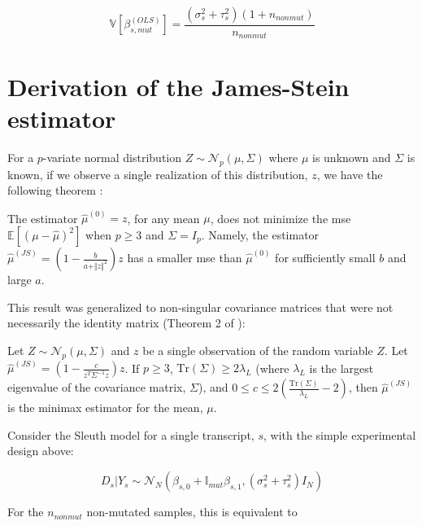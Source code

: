 \begin{equation}
  \mathbb{V} \left[\beta_{s, mut}^{(OLS)} \right] = \frac{(\sigma_s^2 + \tau_s^2)(1 + n_{nonmut})}{n_{nonmut}}
\end{equation}

\section{Derivation of the James-Stein estimator}
\label{sec:JS_derivation}

For a $p$-variate normal distribution $Z \sim \mathcal{N}_p(\mu, \Sigma)$ where $\mu$ is unknown and $\Sigma$ is known, if we observe a single realization of this distribution, $z$, we have the following theorem \cite{steinInadmissibilityUsualEstimator1956}:

\begin{theorem}
  The estimator $\hat{\mu}^{(0)} = z$, for any mean $\mu$, does not minimize the \gls{mse} $\mathbb{E} \left[ (\mu - \hat{\mu})^2 \right]$ when $p \ge 3$ and $\Sigma = I_p$. Namely, the estimator $\hat{\mu}^{(JS)} = \left( 1 - \frac{b}{a + \Vert z \Vert ^2}\right) z$ has a smaller \gls{mse} than $\hat{\mu}^{(0)}$ for sufficiently small $b$ and large $a$.
\end{theorem}

This result was generalized to non-singular covariance matrices that were not necessarily the identity matrix (Theorem 2 of \cite[REF][]{bockMinimaxEstimatorsMean1975}):

\begin{theorem}
  Let $Z \sim \mathcal{N}_p \left(\mu, \Sigma \right)$ and $z$ be a single observation of the random variable $Z$.
  Let $\hat{\mu}^{(JS)} = \left( 1 - \frac{c}{z^T \Sigma^{-1} z}\right) z$.
If $p \ge 3$, $\text{Tr}(\Sigma) \ge 2 \lambda_L$ (where $\lambda_L$ is the largest eigenvalue of the covariance matrix, $\Sigma$), and $0 \le c \le 2 \left( \frac{\text{Tr}(\Sigma)}{\lambda_L} - 2 \right)$, then $\hat{\mu}^{(JS)}$ is the minimax estimator for the mean, $\mu$.
\end{theorem}

Consider the Sleuth model for a single transcript, $s$, with the simple experimental design above:

\begin{equation*}
  D_s | Y_s \sim \mathcal{N}_N \left( \beta_{s,0} + \mathbb{I}_{mut}\beta_{s,1}, (\sigma_s^2 + \tau_s^2)I_N \right)
\end{equation*}

For the $n_{nonmut}$ non-mutated samples, this is equivalent to

